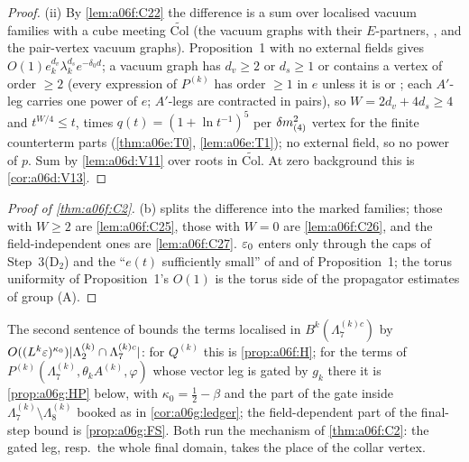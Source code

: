 \begin{proof}
(ii) By \cref{lem:a06f:C22} the difference is a sum over localised vacuum families with a cube meeting $\widetilde{\mathrm{Col}}$ (the vacuum graphs with their $E$-partners, \cite[pp.~420, 422]{Ba3}, and the pair-vertex vacuum graphs). Proposition~1 with no external fields gives $O(1)e_k^{d_v}\lambda_k^{d_s}e^{-\delta_0d}$; a vacuum graph has $d_v\ge2$ or $d_s\ge1$ or contains a \cite[(1.7)]{Ba3} vertex of order $\ge2$ (every expression of $P^{(k)}$ has order $\ge1$ in $e$ unless it is \cite[(1.6)]{Ba3} or \cite[(1.7)]{Ba3}; each $A'$-leg carries one power of $e$; $A'$-legs are contracted in pairs), so $W=2d_v+4d_s\ge4$ and $t^{W/4}\le t$, times $q(t)=(1+\ln t^{-1})^5$ per $\delta m^2_{(4)}$ vertex for the finite counterterm parts (\cref{thm:a06e:T0}, \cref{lem:a06e:T1}); no external field, so no power of $p$. Sum by \cref{lem:a06d:V11} over roots in $\widetilde{\mathrm{Col}}$. At zero background this is \cref{cor:a06d:V13}.
\end{proof}

\begin{proof}[Proof of \cref{thm:a06f:C2}]
(b) splits the difference into the marked families; those with $W\ge2$ are \cref{lem:a06f:C25}, those with $W=0$ are \cref{lem:a06f:C26}, and the field-independent ones are \cref{lem:a06f:C27}. $\varepsilon_0$ enters only through the caps of Step~3(D$_2$) and the ``$e(t)$ sufficiently small'' of \cite[(2.24)]{Ba1} and of Proposition~1; the torus uniformity of Proposition~1's $O(1)$ is the torus side of the propagator estimates of group (A).
\end{proof}

\begin{remark}\label{rem:a06f:HP}
The second sentence of \cite[p.~579]{Ba2} bounds the terms localised in $B^k(\Lambda^{(k)c}_7)$ by $O((L^k\varepsilon)^{\kappa_0})|\Lambda^{(k)}_2\cap\Lambda^{(k)c}_7|$: for $Q^{(k)}$ this is \cref{prop:a06f:H}; for the terms of $P^{(k)}(\Lambda^{(k)}_7,\theta_kA^{(k)},\varphi)$ whose vector leg is gated by $g_k$ there it is \cref{prop:a06g:HP} below, with $\kappa_0=\frac12-\beta$ and the part of the gate inside $\Lambda^{(k)}_7\setminus\Lambda^{(k)}_8$ booked as in \cref{cor:a06g:ledger}; the field-dependent part of the final-step bound \cite[(2.116)]{Ba2} is \cref{prop:a06g:FS}. Both run the mechanism of \cref{thm:a06f:C2}: the gated leg, resp.\ the whole final domain, takes the place of the collar vertex.
\end{remark}




